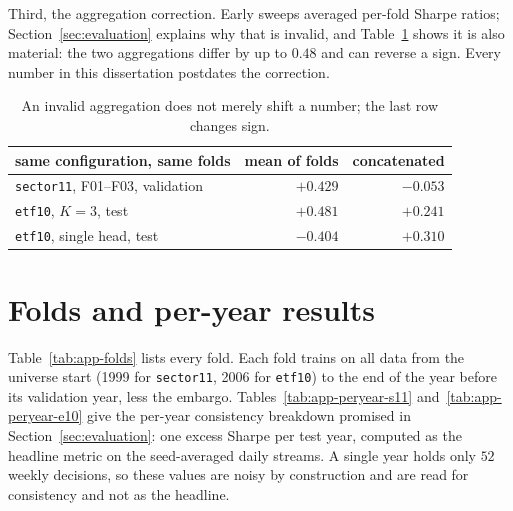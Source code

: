 Third, the aggregation correction. Early sweeps averaged per-fold Sharpe ratios; Section~\ref{sec:evaluation} explains why that is invalid, and Table~\ref{tab:app-metric} shows it is also material: the two aggregations differ by up to $0.48$ and can reverse a sign. Every number in this dissertation postdates the correction.

\begin{table}[t]
  \centering
  \begin{tabular}{l rr}
    \hline
    same configuration, same folds & mean of folds & concatenated \\
    \hline
    \texttt{sector11}, F01--F03, validation      & $+0.429$ & $-0.053$ \\
    \texttt{etf10}, $K{=}3$, test                & $+0.481$ & $+0.241$ \\
    \texttt{etf10}, single head, test            & $-0.404$ & $+0.310$ \\
    \hline
  \end{tabular}
  \caption[Mean-of-folds against the concatenated metric]{An invalid
  aggregation does not merely shift a number; the last row changes sign.}
  \label{tab:app-metric}
\end{table}

\chapter{Folds and per-year results}
\label{app:folds}

Table~\ref{tab:app-folds} lists every fold. Each fold trains on all data from the universe start (1999 for \texttt{sector11}, 2006 for \texttt{etf10}) to the end of the year before its validation year, less the embargo. Tables~\ref{tab:app-peryear-s11} and~\ref{tab:app-peryear-e10} give the per-year consistency breakdown promised in Section~\ref{sec:evaluation}: one excess Sharpe per test year, computed as the headline metric on the seed-averaged daily streams. A single year holds only $52$ weekly decisions, so these values are noisy by construction and are read for consistency and not as the headline.

